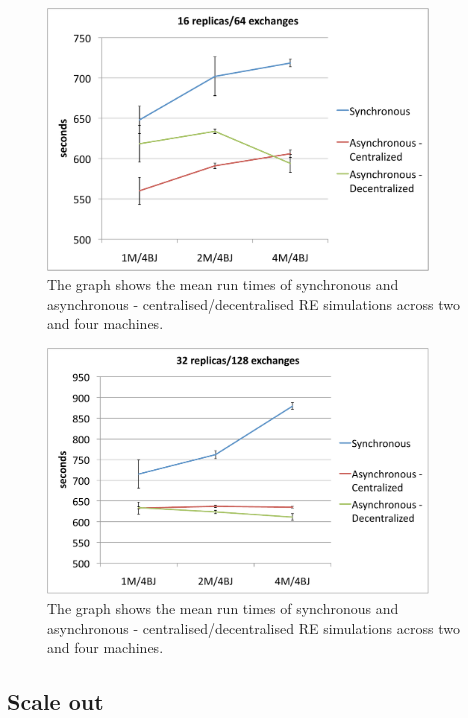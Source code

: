 \documentclass{rspublic}
\begin{document}
\begin{figure}
\centering
\includegraphics[width=0.9\textwidth]{../data/16rep.pdf}
\caption{\small The graph shows the mean run times of synchronous and
  asynchronous - centralised/decentralised RE simulations across two
  and four machines.}
\label{fig:2machines}
\vspace{-1em}
\end{figure}

\begin{figure}
\centering
\includegraphics[width=0.9\textwidth]{../data/32rep.pdf}
\caption{\small The graph shows the mean run times of synchronous and
  asynchronous - centralised/decentralised RE simulations across two
  and four machines. }
\label{fig:2machines}
\vspace{-1em}
\end{figure}

\subsection{Scale out}
\end{document}
